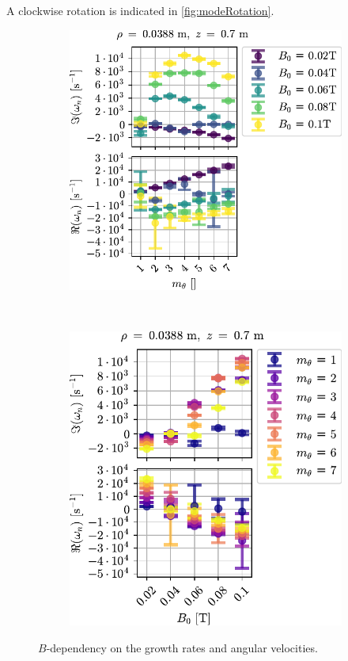 A clockwise rotation is indicated in \cref{fig:modeRotation}.
%
\begin{figure}
    \centering
    \begin{subfigure}[h]{0.50\textwidth}
        \centering
        \includegraphics{fig/results/growthRates/growthRatesB0}
        \label{fig:grB}
    \end{subfigure}%
    \\
    \begin{subfigure}[h]{0.50\textwidth}
        \centering
        \includegraphics{fig/results/growthRates/growthRatesB0ModeNr}
        \label{fig:grBModeNr}
    \end{subfigure}
    \caption{$B$-dependency on the growth rates and angular velocities.}
    \label{fig:gr}
\end{figure}
